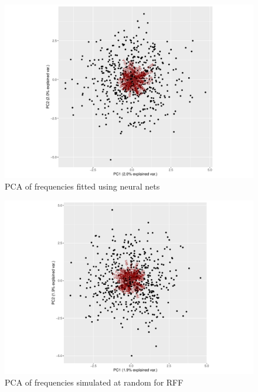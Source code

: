 \documentclass{article} %
\begin{document}
\begin{figure}[h]
\centering
\includegraphics[width=15cm]{PCA_nn}
\caption{PCA of frequencies fitted using neural nets}\label{fig:PCA_nn}
\end{figure}

\begin{figure}[h]
\centering
\includegraphics[width=15cm]{PCA_rff}
\caption{PCA of frequencies simulated at random for RFF}\label{fig:PCA_rff}
\end{figure}
\end{document}
